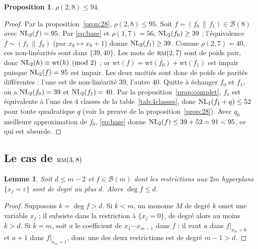 \documentclass[11pt,a4paper]{article}
\newcommand{\wt}{\mathrm{wt}}
\def\NL(#1,#2){ {\rm NL}_{#1}(#2) }
\def\rmc(#1,#2){ \textsc {rm}(#1,#2) }
\def\boole(#1){\mathcal{B}(#1)}
\theoremstyle{plain}
\newtheorem{proposition}[theorem]{Proposition}
\newtheorem{lemma}[theorem]{Lemme}
\theoremstyle{definition}
\theoremstyle{remark}
\begin{document}
\begin{proposition}\label{prop:28b}
$\rho(2,8)\le 94$.
\end{proposition}
\begin{proof}
Par la proposition~\ref{prop:28}, $\rho(2,8)\le 95$. Soit
$f=(f_0\,\|\,f_1)\in\boole(8)$ avec $\NL(2,f)=95$. Par \eqref{eq:base} et
$\rho(1,7)=56$, $\NL(2,f_0)\ge 39$ ; l'équivalence $f\sim(f_1\,\|\,f_0)$
(par $x_8\mapsto x_8+1$) donne $\NL(2,f_1)\ge 39$. Comme $\rho(2,7)=40$, ces
non-linéarités sont dans $\{39,40\}$. Les mots de $\rmc(2,7)$ sont de poids
pair, donc $\NL(2,h)\equiv\wt(h)\pmod 2$ ; or $\wt(f)=\wt(f_0)+\wt(f_1)$
est impair puisque $\NL(2,f)=95$ est impair. Les deux moitiés sont donc de poids
de parités différentes : l'une est de non-linéarité $39$, l'autre $40$. Quitte
à échanger $f_0$ et $f_1$, on a $\NL(2,f_0)=39$ et $\NL(2,f_1)=40$. Par la
proposition~\ref{prop:complet}, $f_1$ est équivalente à l'une des $4$ classes de
la table~\ref{tab:4classes}, donc $\NL(1,f_1+q)\le 52$ pour toute quadratique
$q$ (voir la preuve de la proposition~\ref{prop:28}). Avec $q_0$ meilleure
approximation de $f_0$, \eqref{eq:base} donne
$\NL(2,f)\le 39+52=91<95$, ce qui est absurde.
\end{proof}


\subsection{Le cas de $\rmc(3,8)$}

\begin{lemma}\label{lem:degre}
Soit $d\le m-2$ et $f\in\boole(m)$ dont les restrictions aux $2m$ hyperplans
$\{x_j=\varepsilon\}$ sont de degré au plus $d$. Alors $\deg f\le d$.
\end{lemma}
\begin{proof}
Supposons $k=\deg f>d$. Si $k<m$, un monome $M$ de degré $k$ omet une variable
$x_j$ ; il subsiste dans la restriction à $\{x_j=0\}$, de degré alors au moins
$k>d$. Si $k=m$, soit $a$ le coefficient de $x_1\cdots x_{m-1}$ dans $f$ : il
vaut $a$ dans $f|_{x_m=0}$ et $a+1$ dans $f|_{x_m=1}$, donc une des deux
restrictions est de degré $m-1>d$.
\end{proof}
\end{document}
